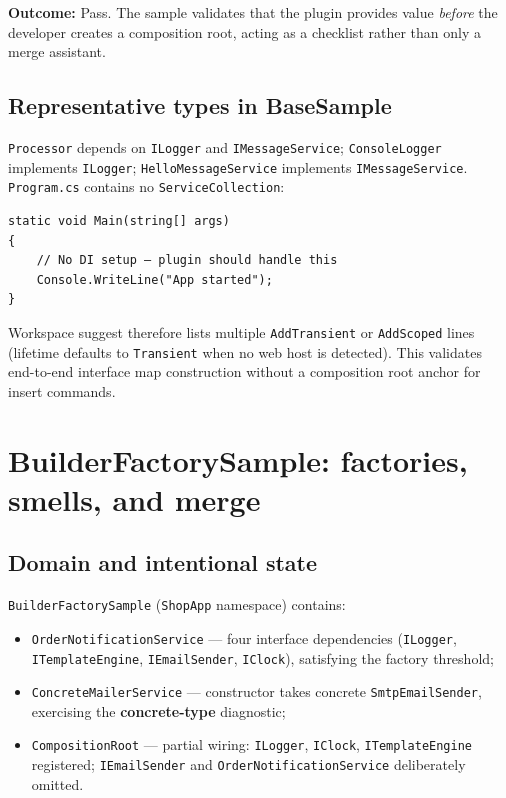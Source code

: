 \textbf{Outcome:} Pass. The sample validates that the plugin provides value \emph{before} the developer creates a composition root, acting as a checklist rather than only a merge assistant.

\subsection{Representative types in BaseSample}

\texttt{Processor} depends on \texttt{ILogger} and \texttt{IMessageService}; \texttt{ConsoleLogger} implements \texttt{ILogger}; \texttt{HelloMessageService} implements \texttt{IMessageService}. \texttt{Program.cs} contains no \texttt{ServiceCollection}:

\begin{lstlisting}[caption={BaseSample Program.cs (excerpt)}]
static void Main(string[] args)
{
    // No DI setup — plugin should handle this
    Console.WriteLine("App started");
}
\end{lstlisting}

Workspace suggest therefore lists multiple \texttt{AddTransient} or \texttt{AddScoped} lines (lifetime defaults to \texttt{Transient} when no web host is detected). This validates end-to-end interface map construction without a composition root anchor for insert commands.

\section{BuilderFactorySample: factories, smells, and merge}
\label{chap5:builder}

\subsection{Domain and intentional state}

\texttt{BuilderFactorySample} (\texttt{ShopApp} namespace) contains:
\begin{itemize}
	\item \texttt{OrderNotificationService} --- four interface dependencies (\texttt{ILogger}, \texttt{ITemplateEngine}, \texttt{IEmailSender}, \texttt{IClock}), satisfying the factory threshold;
	\item \texttt{ConcreteMailerService} --- constructor takes concrete \texttt{SmtpEmailSender}, exercising the \textbf{concrete-type} diagnostic;
	\item \texttt{CompositionRoot} --- partial wiring: \texttt{ILogger}, \texttt{IClock}, \texttt{ITemplateEngine} registered; \texttt{IEmailSender} and \texttt{OrderNotificationService} deliberately omitted.
\end{itemize}


